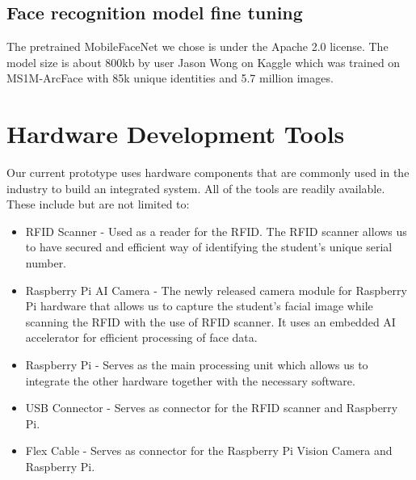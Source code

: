 \subsection{Face recognition model fine tuning}
The pretrained MobileFaceNet we chose is under the Apache 2.0 license. The model size is about 800kb by user Jason Wong on Kaggle which was trained on MS1M-ArcFace with 85k unique identities and 5.7 million images.

\section{Hardware Development Tools}
Our current prototype uses hardware components that are commonly used in the industry to build an integrated system. All of the tools are readily available. These include but are not limited to:

\begin{itemize}
	\item	RFID Scanner - Used as a reader for the RFID. The RFID scanner allows us to have secured and efficient way of identifying the student's unique serial number.

\end{itemize}

\begin{itemize}
	\item	Raspberry Pi AI Camera - The newly released camera module for Raspberry Pi hardware that allows us to capture the student's facial image while scanning the RFID with the use of RFID scanner. It uses an embedded AI accelerator for efficient processing of face data.
	
\end{itemize} 

\begin{itemize}
	\item	Raspberry Pi - Serves as the main processing unit which allows us to integrate the other hardware together with the necessary software.
	
\end{itemize}

\begin{itemize}
	\item	USB Connector -  Serves as connector for the RFID scanner and Raspberry Pi.
	
\end{itemize}

\begin{itemize}
	\item	Flex Cable -  Serves as connector for the Raspberry Pi Vision Camera and Raspberry Pi. 
	
\end{itemize}
	
